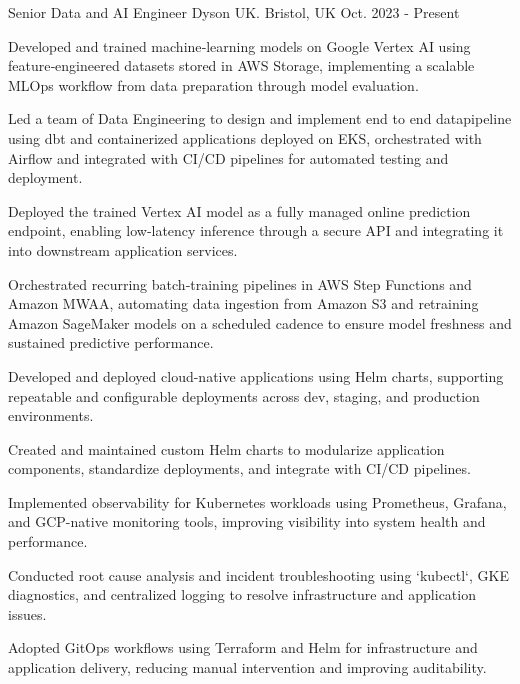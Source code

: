 

\begin{cventries}

  \cventry
    {Senior Data and AI Engineer} %
    {Dyson UK.} %
    {Bristol, UK} %
    {Oct. 2023 - Present} %
    {
      \begin{cvitems} %
        \item {Developed and trained machine‑learning models on Google Vertex AI using feature‑engineered datasets stored in AWS Storage, implementing a scalable MLOps workflow from data preparation through model evaluation.}       
        \item {Led a team of Data Engineering to design and implement end to end datapipeline using dbt and containerized applications deployed on EKS, orchestrated with Airflow and integrated with CI/CD pipelines for automated testing and deployment.}       
        \item {Deployed the trained Vertex AI model as a fully managed online prediction endpoint, enabling low‑latency inference through a secure API and integrating it into downstream application services.}
        \item {Orchestrated recurring batch‑training pipelines in AWS Step Functions and Amazon MWAA, automating data ingestion from Amazon S3 and retraining Amazon SageMaker models on a scheduled cadence to ensure model freshness and sustained predictive performance.}
        \item {Developed and deployed cloud-native applications using Helm charts, supporting repeatable and configurable deployments across dev, staging, and production environments.}
        \item {Created and maintained custom Helm charts to modularize application components, standardize deployments, and integrate with CI/CD pipelines.}
        \item {Implemented observability for Kubernetes workloads using Prometheus, Grafana, and GCP-native monitoring tools, improving visibility into system health and performance.}
        \item {Conducted root cause analysis and incident troubleshooting using `kubectl`, GKE diagnostics, and centralized logging to resolve infrastructure and application issues.}
        \item {Adopted GitOps workflows using Terraform and Helm for infrastructure and application delivery, reducing manual intervention and improving auditability.}
    \end{cvitems} 
    }    


\end{cventries}
